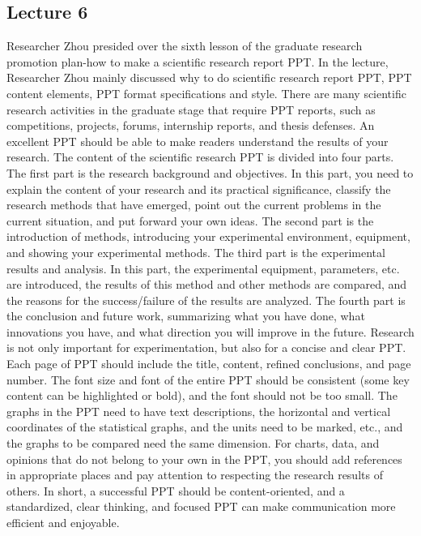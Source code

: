 \documentclass[UTF-8]{ctexart}
\begin{document}
\subsection{Lecture 6} 
Researcher Zhou presided over the sixth lesson of the graduate research promotion plan-how to make a scientific research report PPT. In the lecture, Researcher Zhou mainly discussed why to do scientific research report PPT, PPT content elements, PPT format specifications and style.
There are many scientific research activities in the graduate stage that require PPT reports, such as competitions, projects, forums, internship reports, and thesis defenses. An excellent PPT should be able to make readers understand the results of your research.
The content of the scientific research PPT is divided into four parts. The first part is the research background and objectives. In this part, you need to explain the content of your research and its practical significance, classify the research methods that have emerged, point out the current problems in the current situation, and put forward your own ideas. The second part is the introduction of methods, introducing your experimental environment, equipment, and showing your experimental methods. The third part is the experimental results and analysis. In this part, the experimental equipment, parameters, etc. are introduced, the results of this method and other methods are compared, and the reasons for the success/failure of the results are analyzed. The fourth part is the conclusion and future work, summarizing what you have done, what innovations you have, and what direction you will improve in the future.
Research is not only important for experimentation, but also for a concise and clear PPT. Each page of PPT should include the title, content, refined conclusions, and page number. The font size and font of the entire PPT should be consistent (some key content can be highlighted or bold), and the font should not be too small. The graphs in the PPT need to have text descriptions, the horizontal and vertical coordinates of the statistical graphs, and the units need to be marked, etc., and the graphs to be compared need the same dimension. For charts, data, and opinions that do not belong to your own in the PPT, you should add references in appropriate places and pay attention to respecting the research results of others. In short, a successful PPT should be content-oriented, and a standardized, clear thinking, and focused PPT can make communication more efficient and enjoyable.
\end{document}
